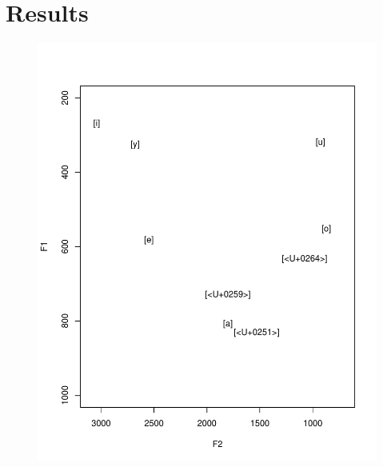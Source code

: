 \documentclass[man, fleqn, noextraspace]{apa6}
\begin{document}
\section{Results}\label{results}

\begin{figure}
\centering
\includegraphics{Vowel_v2_files/figure-latex/figure1-1.pdf}
\caption{}
\end{figure}
\end{document}
